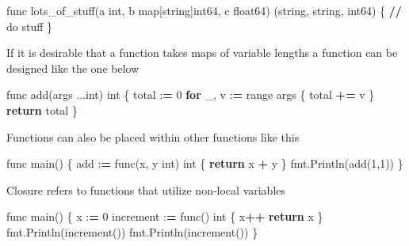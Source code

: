 \documentclass[]{book}
\newenvironment{Shaded}{\begin{snugshade}}{\end{snugshade}}
\newcommand{\DecValTok}[1]{\textcolor[rgb]{0.00,0.00,0.81}{#1}}
\newcommand{\ControlFlowTok}[1]{\textcolor[rgb]{0.13,0.29,0.53}{\textbf{#1}}}
\newcommand{\OperatorTok}[1]{\textcolor[rgb]{0.81,0.36,0.00}{\textbf{#1}}}
\newcommand{\BuiltInTok}[1]{#1}
\newcommand{\NormalTok}[1]{#1}
\begin{document}
\begin{Shaded}
\begin{Highlighting}[]
\NormalTok{func lots_of_stuff(a }\BuiltInTok{int}\NormalTok{, b }\BuiltInTok{map}\NormalTok{[string]int64, c float64) (string, string, int64) \{}
\OperatorTok{//}\NormalTok{ do stuff}
\NormalTok{\}}
\end{Highlighting}
\end{Shaded}

If it is desirable that a function takes maps of variable lengths a
function can be designed like the one below

\begin{Shaded}
\begin{Highlighting}[]
\NormalTok{func add(args ...}\BuiltInTok{int}\NormalTok{) }\BuiltInTok{int}\NormalTok{ \{ }
\NormalTok{    total :}\OperatorTok{=} \DecValTok{0}              
    \ControlFlowTok{for}\NormalTok{ _, v :}\OperatorTok{=} \BuiltInTok{range}\NormalTok{ args \{}
\NormalTok{        total }\OperatorTok{+=}\NormalTok{ v          }
\NormalTok{    \}                       }
    \ControlFlowTok{return}\NormalTok{ total            }
\NormalTok{\}  }
\end{Highlighting}
\end{Shaded}

Functions can also be placed within other functions like this

\begin{Shaded}
\begin{Highlighting}[]
\NormalTok{func main() \{}
\NormalTok{  add :}\OperatorTok{=}\NormalTok{ func(x, y }\BuiltInTok{int}\NormalTok{) }\BuiltInTok{int}\NormalTok{ \{}
    \ControlFlowTok{return}\NormalTok{ x }\OperatorTok{+}\NormalTok{ y}
\NormalTok{  \}}
\NormalTok{  fmt.Println(add(}\DecValTok{1}\NormalTok{,}\DecValTok{1}\NormalTok{))}
\NormalTok{\}}
\end{Highlighting}
\end{Shaded}

Closure refers to functions that utilize non-local variables

\begin{Shaded}
\begin{Highlighting}[]
\NormalTok{func main() \{}
\NormalTok{  x :}\OperatorTok{=} \DecValTok{0}
\NormalTok{  increment :}\OperatorTok{=}\NormalTok{ func() }\BuiltInTok{int}\NormalTok{ \{}
\NormalTok{    x}\OperatorTok{++}
    \ControlFlowTok{return}\NormalTok{ x}
\NormalTok{  \}}
\NormalTok{  fmt.Println(increment())}
\NormalTok{  fmt.Println(increment())}
\NormalTok{\}}
\end{Highlighting}
\end{Shaded}
\end{document}
